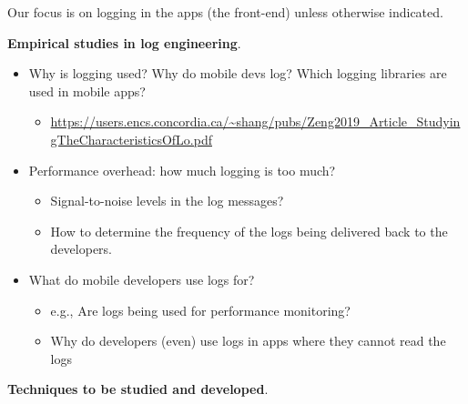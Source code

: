 \documentclass[a4paper]{article}
\newcommand{\smallsection}[1]{\noindent \textbf{#1}. }
\begin{document}
Our focus is on logging in the apps (the front-end) unless otherwise
indicated.

\smallsection{Empirical studies in log engineering}

\begin{itemize}
\tightlist
\item
  Why is logging used? Why do mobile devs log? Which logging libraries
  are used in mobile apps?
  \begin{itemize}
    \tightlist
    \item \url{https://users.encs.concordia.ca/~shang/pubs/Zeng2019_Article_StudyingTheCharacteristicsOfLo.pdf}
  \end{itemize}  
\item
  Performance overhead: how much logging is too much?
  \begin{itemize}
    \tightlist
    \item Signal-to-noise levels in the log messages?
    \item How to determine the frequency of the logs being delivered back to the developers.
  \end{itemize}
\item
  What do mobile developers use logs for?
  \begin{itemize}
    \tightlist
    \item e.g., Are logs being used for performance monitoring?
    \item Why do developers (even) use logs in apps where they cannot read the logs
  \end{itemize}
\end{itemize}

\smallsection{Techniques to be studied and developed}
\end{document}

